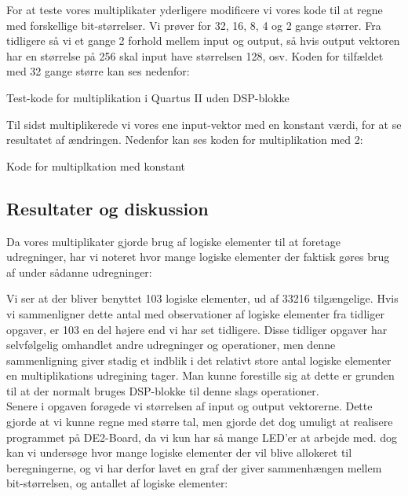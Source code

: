 \documentclass[../journal2.tex]{subfiles}
\begin{document}
For at teste vores multiplikater yderligere modificere vi vores kode til at regne med forskellige bit-størrelser. Vi prøver for 32, 16, 8, 4 og 2 gange størrer. Fra tidligere så vi et gange 2 forhold mellem input og output, så hvis output vektoren har en størrelse på 256 skal input have størrelsen 128, osv. Koden for tilfældet med 32 gange større kan ses nedenfor:

\begin{table}[H]
    \centering
      \framebox{
        \rule{8pt}{0pt}
          
}
  \caption{Test-kode for multiplikation i Quartus II uden DSP-blokke}	
  \label{src:Tab2}
\end{table}

Til sidst multiplikerede vi vores ene input-vektor med en konstant værdi, for at se resultatet af ændringen. Nedenfor kan ses koden for multiplikation med 2:

\begin{table}[H]
    \centering
      \framebox{
        \rule{8pt}{0pt}
          
}
  \caption{Kode for multiplkation med konstant}	
  \label{src:Tab2}
\end{table}


\subsection{Resultater og diskussion}

Da vores multiplikater gjorde brug af logiske elementer til at foretage udregninger, har vi noteret hvor mange logiske elementer der faktisk gøres brug af under sådanne udregninger:


Vi ser at der bliver benyttet 103 logiske elementer, ud af 33216 tilgængelige. Hvis vi sammenligner dette antal med observationer af logiske elementer fra tidliger opgaver, er 103 en del højere end vi har set tidligere. Disse tidliger opgaver har selvfølgelig omhandlet andre udregninger og operationer, men denne sammenligning giver stadig et indblik i det relativt store antal logiske elementer en multiplikations udregining tager. Man kunne forestille sig at dette er grunden til at der normalt bruges DSP-blokke til denne slags operationer.\\

Senere i opgaven forøgede vi størrelsen af input og output vektorerne. Dette gjorde at vi kunne regne med større tal, men gjorde det dog umuligt at realisere programmet på DE2-Board, da vi kun har så mange LED'er at arbejde med. dog kan vi undersøge hvor mange logiske elementer der vil blive allokeret til beregningerne, og vi har derfor lavet en graf der giver sammenhængen mellem bit-størrelsen, og antallet af logiske elementer:
\end{document}
